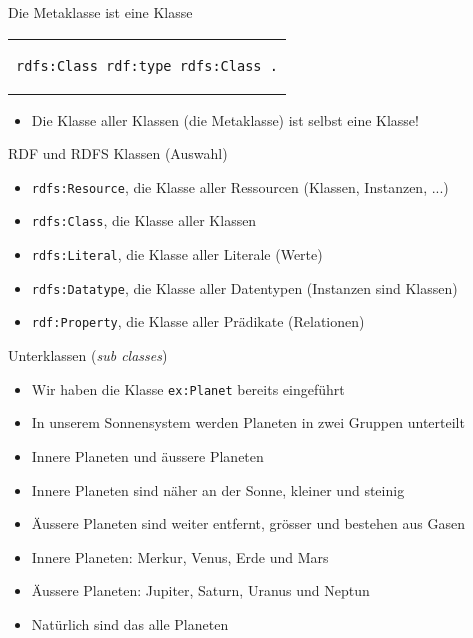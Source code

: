 \documentclass{beamer}
\begin{document}
\begin{frame}[fragile]{Die Metaklasse ist eine Klasse}
	
	\begin{center}
		\begin{tabular}{c}
			\begin{lstlisting}
rdfs:Class rdf:type rdfs:Class .
			\end{lstlisting}
		\end{tabular}
	\end{center}
	
	\vspace{0.5cm}
	
	\begin{itemize}
		\item Die Klasse aller Klassen (die Metaklasse) ist selbst eine Klasse!
	\end{itemize}
	
\end{frame}

\begin{frame}{RDF und RDFS Klassen (Auswahl)}
	
	\begin{itemize}
		\item \texttt{rdfs:Resource}, die Klasse aller Ressourcen (Klassen, Instanzen, ...)
		\item \texttt{rdfs:Class}, die Klasse aller Klassen
		\item \texttt{rdfs:Literal}, die Klasse aller Literale (Werte)
		\item \texttt{rdfs:Datatype}, die Klasse aller Datentypen (Instanzen sind Klassen)
		\item \texttt{rdf:Property}, die Klasse aller Prädikate (Relationen)
	\end{itemize}
	
\end{frame}

\begin{frame}{Unterklassen (\emph{sub classes})}
	
	\begin{itemize}
		\item Wir haben die Klasse \texttt{ex:Planet} bereits eingeführt
		\item In unserem Sonnensystem werden Planeten in zwei Gruppen unterteilt
		\item Innere Planeten und äussere Planeten
		\item Innere Planeten sind näher an der Sonne, kleiner und steinig
		\item Äussere Planeten sind weiter entfernt, grösser und bestehen aus Gasen
		\item Innere Planeten: Merkur, Venus, Erde und Mars
		\item Äussere Planeten: Jupiter, Saturn, Uranus und Neptun
		\item Natürlich sind das alle Planeten
	\end{itemize}
	
\end{frame}
\end{document}
